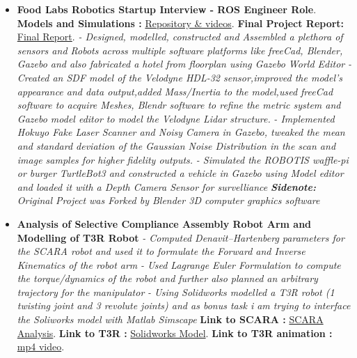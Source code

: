 \documentclass[a4paper,12pt]{article}
\begin{document}
\begin{itemize}
    \item{\textbf{\large{Food Labs Robotics Startup Interview - ROS Engineer Role}}.
    \newline
    \textbf{ Models and Simulations :} \href{https://github.com/teetangh/Kaustav-ROS-Workspace}{Repository \& videos}.
    \textbf{  Final Project Report:} \href{https://github.com/teetangh/Kaustav-ROS-Workspace/blob/master/Resources/Final%20Report.pdf}{Final Report}.
    \newline
    \textit{- Designed, modelled, constructed and
    Assembled a plethora of sensors and Robots across multiple software platforms like
    freeCad, Blender, Gazebo and also fabricated a hotel from floorplan using Gazebo World Editor}
    \newline
    \textit{- Created an SDF model of the Velodyne HDL-32 sensor,improved the model's appearance and data output,added Mass/Inertia to the model,used freeCad software to acquire Meshes, Blendr software to refine the metric system and Gazebo model editor to model the Velodyne Lidar structure.}
    \newline
    \textit{- Implemented Hokuyo Fake Laser Scanner and Noisy Camera in Gazebo, tweaked the mean and standard deviation of the Gaussian Noise Distribution in the scan and image samples for higher fidelity outputs.}
    \newline
    \textit{- Simulated the ROBOTIS waffle-pi or burger TurtleBot3 and constructed a vehicle in Gazebo using Model editor and loaded it with a Depth Camera Sensor for survelliance}
    \newline
    \textit{\textbf{Sidenote:} Original Project was Forked by Blender 3D computer graphics software }}
    \newline
    
    \pagebreak
    \item{\textbf{\large{Analysis of Selective Compliance Assembly Robot Arm and Modelling of T3R Robot}}
    \newline
    \textit{- Computed Denavit–Hartenberg parameters for the SCARA robot and used it to formulate the Forward and Inverse Kinematics of the robot arm} 
    \newline
    \textit{- Used Lagrange Euler Formulation to compute the torque/dynamics of the robot and further also planned an arbitrary trajectory for the manipulator} 
    \newline
    \textit{- Using Solidworks modelled a T3R robot (1 twisting joint and 3 revolute joints) and as bonus task i am trying to interface the Soliworks model with Matlab Simscape}} 
    \newline
    \textbf{ Link to SCARA :} \href{https://github.com/teetangh/Robotics-Projects/blob/master/SCARA_Robot_Analysis.pdf}{SCARA Analysis}.
    \newline
    \textbf{ Link to T3R :} \href{https://github.com/teetangh/Robotics-Projects/tree/master/T3R%20Robot}{Solidworks Model}.
    \textbf{ Link to T3R animation :} \href{https://github.com/teetangh/Robotics-Projects/blob/master/T3R%20Robot/Resources/T3R%20Animation.mp4}{mp4 video}.
    \newline
    
    
\end{itemize}
\end{document}
